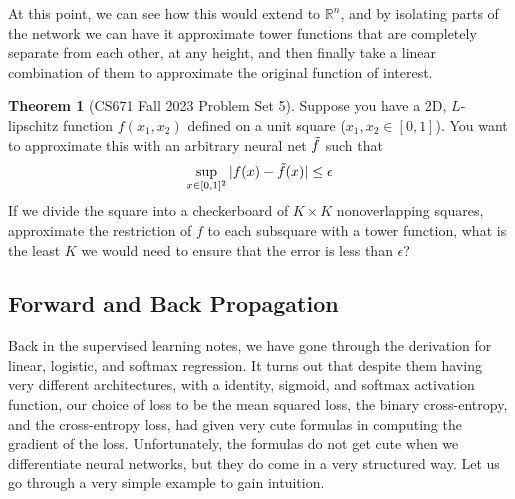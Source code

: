 \documentclass{article}
\theoremstyle{definition}
\newtheorem{theorem}{Theorem}[section]
\theoremstyle{remark}
\theoremstyle{definition}
\begin{document}
    At this point, we can see how this would extend to $\mathbb{R}^n$, and by isolating parts of the network we can have it approximate tower functions that are completely separate from each other, at any height, and then finally take a linear combination of them to approximate the original function of interest.  

    \begin{theorem}[CS671 Fall 2023 Problem Set 5]
      Suppose you have a 2D, $L$-lipschitz function $f(x_1, x_2)$ defined on a unit square ($x_1, x_2 \in \left [0,1 \right ]$). You want to approximate this with an arbitrary neural net $\Tilde{f}$ such that
        \[\sup_{x \in [0, 1]^2} |f(x) - \Tilde{f}(x)| \leq \epsilon\]    
      If we divide the square into a checkerboard of $K \times K$ nonoverlapping squares, approximate the restriction of $f$ to each subsquare with a tower function, what is the least $K$ we would need to ensure that the error is less than $\epsilon$? 
    \end{theorem} 

  \subsection{Forward and Back Propagation}

    Back in the supervised learning notes, we have gone through the derivation for linear, logistic, and softmax regression. It turns out that despite them having very different architectures, with a identity, sigmoid, and softmax activation function, our choice of loss to be the mean squared loss, the binary cross-entropy, and the cross-entropy loss, had given very cute formulas in computing the gradient of the loss. Unfortunately, the formulas do not get cute when we differentiate neural networks, but they do come in a very structured way. Let us go through a very simple example to gain intuition. 
\end{document}
